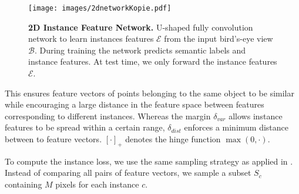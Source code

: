 \documentclass[runningheads]{llncs}
\begin{document}
{\begin{figure}[t]
	\centering
	\texttt{[image: images/2dnetworkKopie.pdf]}
	\caption{\textbf{2D Instance Feature Network.} U-shaped fully convolution network to learn instances features $\mathcal{E}$ from the input bird's-eye view $\mathcal{B}$.
	During training the network predicts semantic labels and instance features.
	At test time, we only forward the instance features $\mathcal{E}$.}
	\label{fig:2d_network}
\end{figure}

This ensures feature vectors of points belonging to the same object to be similar while encouraging a large distance in the feature space between features corresponding to different instances. 
Whereas the margin $\delta_{var}$ allows instance features to be spread within a certain range, $\delta_{dist}$ enforces a minimum distance between to feature vectors.
$[\cdot]_+$ denotes the hinge function $\max(0,\cdot)$.

To compute the instance loss, we use the same sampling strategy as applied in \cite{Fathi17CoRR,Newell17NIPS}. Instead of comparing all pairs of feature vectors, we sample a subset $S_c$ containing $M$ pixels for each instance $c$.



}
\end{document}
